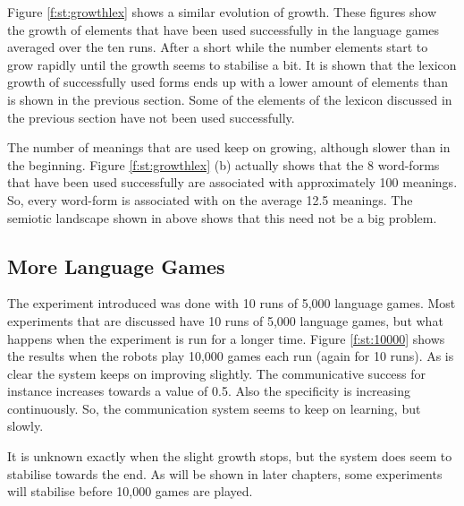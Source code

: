 Figure \ref{f:st:growthlex} shows a similar evolution of growth. These figures show the growth of elements that have been used successfully in the language games averaged over the ten runs. After a short while the number elements start to grow rapidly until the growth seems to stabilise a bit. It is shown that the lexicon growth of successfully used forms ends up with a lower amount of elements than is shown in the previous section. Some of the elements of the lexicon discussed in the previous section have not been used successfully.

The number of meanings that are used keep on growing, although slower than in the beginning. Figure \ref{f:st:growthlex} (b) actually shows that the 8 word-forms that have been used successfully are associated with approximately 100 meanings. So, every word-form is associated with on the average 12.5 meanings. The semiotic landscape shown in above shows that this need not be a big problem.

\subsection{More Language Games}\label{s:st:10000}

The experiment introduced was done with 10 runs of 5,000 language games. Most experiments that are discussed have 10 runs of 5,000 language games, but what happens when the experiment is run for a longer time. Figure \ref{f:st:10000} shows the results when the robots play 10,000 games each run (again for 10 runs). As is clear the system keeps on improving slightly. The communicative success for instance increases towards a value of 0.5. Also the specificity is increasing continuously. So, the communication system seems to keep on learning, but slowly.

It is unknown exactly when the slight growth stops, but the system does seem to stabilise towards the end. As will be shown in later chapters, some experiments will stabilise before 10,000 games are played.




